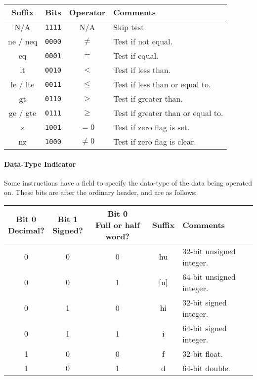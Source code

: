 \documentclass[10pt]{article}
\begin{document}
\medskip
\begin{tabular}{|c|c|c|l|}
    \hline
    \textbf{Suffix} & \textbf{Bits} & \textbf{Operator} & \textbf{Comments} \\
    \hline
    N/A & \texttt{1111} & N/A & Skip test. \\
    \hline
    ne / neq & \texttt{0000} & \(\neq\) & Test if not equal. \\
    eq & \texttt{0001} & \(=\) & Test if equal. \\
    \hline
    lt & \texttt{0010} & \(<\) & Test if less than. \\
    le / lte & \texttt{0011} & \(\le\) & Test if less than or equal to. \\
    \hline
    gt & \texttt{0110} & \(>\) & Test if greater than. \\
    ge / gte & \texttt{0111} & \(\ge\) & Test if greater than or equal to. \\
    \hline
    z & \texttt{1001} & \(= 0\) & Test if zero flag is set. \\
    nz & \texttt{1000} & \(\neq 0\) & Test if zero flag is clear. \\
    \hline
\end{tabular}

\paragraph{Data-Type Indicator}
Some instructions have a field to specify the data-type of the data being operated on.
These bits are after the ordinary header, and are as follows:

\bigskip
\begin{tabular}{|c|c|c||c|l|}
    \hline
    \makecell[c]{\textbf{Bit 0}\\Decimal?} & \makecell[c]{\textbf{Bit 1}\\Signed?} & \makecell[c]{\textbf{Bit 0}\\Full or half word?} & \textbf{Suffix} & \textbf{Comments} \\
    \hline
    0 & 0 & 0 & hu & 32-bit unsigned integer. \\
    \hline
    0 & 0 & 1 & [u] & 64-bit unsigned integer. \\
    \hline
    0 & 1 & 0 & hi & 32-bit signed integer. \\
    \hline
    0 & 1 & 1 & i & 64-bit signed integer. \\
    \hline
    1 & 0 & 0 & f & 32-bit float. \\
    \hline
    1 & 0 & 1 & d & 64-bit double. \\
    \hline
\end{tabular}
\end{document}
